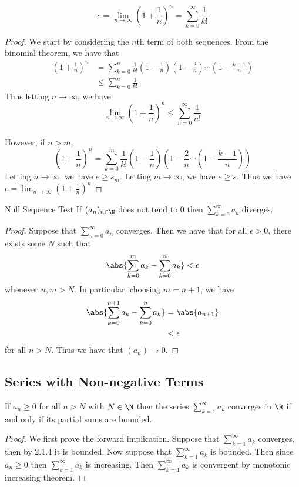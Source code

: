 \begin{prp}{}{} $$e=\lim_{n\to\infty}\left(1+\frac{1}{n}\right)^n=\sum_{k=0}^{\infty}\frac{1}{k!}$$ \tcbline
\begin{proof} We start by considering the $n$th term of both sequences. From the binomial theorem, we have that
\begin{align*}
\left(1+\frac{1}{n}\right)^n&=\sum_{k=0}^{n}\frac{1}{k!}\left(1-\frac{1}{n}\right)\left(1-\frac{2}{n}\right)\cdots\left(1-\frac{k-1}{n}\right)\\
&\leq\sum_{k=0}^{n}\frac{1}{k!}
\end{align*} Thus letting $n\to\infty$, we have $$\lim_{n\to\infty}\left(1+\frac{1}{n}\right)^n\leq\sum_{n=0}^{\infty}\frac{1}{n!}$$\\
However, if $n>m$, $$\left(1+\frac{1}{n}\right)^n=\sum_{k=0}^{m}\frac{1}{k!}\left(1-\frac{1}{n}\right)\left(1-\frac{2}{n}\cdots\left(1-\frac{k-1}{n}\right)\right)$$ Letting $n\to\infty$, we have $e\geq s_m$. Letting $m\to\infty$, we have $e\geq s$. Thus we have $e=\lim_{n\to\infty}\left(1+\frac{1}{n}\right)^n$
\end{proof}
\end{prp}

\begin{thm}{Null Sequence Test}{} If $(a_n)_{n\in\N}$ does not tend to $0$ then $\sum_{k=0}^\infty a_k$ diverges. \tcbline
\begin{proof} Suppose that $\sum_{n=0}^\infty a_n$ converges. Then we have that for all $\epsilon>0$, there exists some $N$ such that $$\abs{\sum_{k=0}^m a_k-\sum_{k=0}^n a_k}<\epsilon$$ whenever $n,m>N$. In particular, choosing $m=n+1$, we have
\begin{align*}
\abs{\sum_{k=0}^{n+1} a_k-\sum_{k=0}^n a_k}&=\abs{a_{n+1}}\\
&<\epsilon
\end{align*} for all $n>N$. Thus we have that $(a_{n})\to 0$. 
\end{proof}
\end{thm}

\subsection{Series with Non-negative Terms}
\begin{thm}{}{} If $a_n\geq 0 $ for all $n>N$ with $N\in\N$ then the series $\sum_{k=1}^\infty a_k$ converges in $\R$ if and only if its partial sums are bounded. \tcbline
\begin{proof} We first prove the forward implication. Suppose that $\sum_{k=1}^\infty a_k$ converges, then by 2.1.4 it is bounded. Now suppose that $\sum_{k=1}^\infty a_k$ is bounded. Then since $a_n\geq0$ then $\sum_{k=1}^\infty a_k$ is increasing. Then $\sum_{k=1}^\infty a_k$ is convergent by monotonic increasing theorem. 
\end{proof}
\end{thm}

